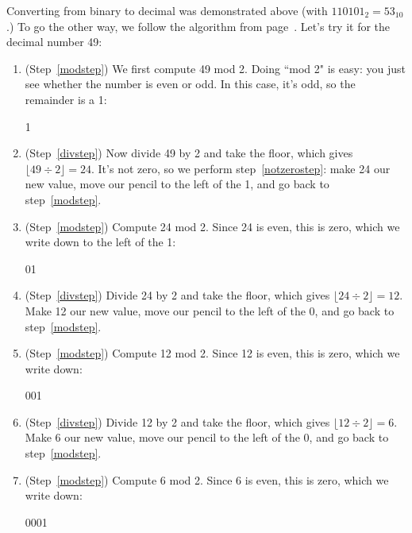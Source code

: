 Converting from binary to decimal was demonstrated above (with
$110101_2=53_{10}$.) To go the other way, we follow the algorithm from
page~\pageref{convertalgorithm}. Let's try it for the decimal number 49:

\begin{enumerate}
\item (Step~\ref{modstep}) We first compute 49 mod 2. Doing ``mod 2" is
easy: you just see whether the number is even or odd. In this case, it's
odd, so the remainder is a 1:

{\Large
\begin{center}
1
\end{center}
}

\item (Step~\ref{divstep}) Now divide 49 by 2 and take the floor, which
gives $\lfloor \text{49} \div 2 \rfloor = 24$. It's not zero, so
we perform step~\ref{notzerostep}: make 24 our new value, move
our pencil to the left of the 1, and go back to step~\ref{modstep}.

\item (Step~\ref{modstep}) Compute 24 mod 2. Since 24 is even, this is
zero, which we write down to the left of the 1:

{\Large
\begin{center}
01
\end{center}
}

\item (Step~\ref{divstep}) Divide 24 by 2 and take the floor, which gives
$\lfloor \text{24} \div 2 \rfloor = 12$.  Make 12 our new value, move our
pencil to the left of the 0, and go back to step~\ref{modstep}.

\item (Step~\ref{modstep}) Compute 12 mod 2. Since 12 is even, this is
zero, which we write down:

{\Large
\begin{center}
001
\end{center}
}

\item (Step~\ref{divstep}) Divide 12 by 2 and take the floor, which gives
$\lfloor \text{12} \div 2 \rfloor = 6$.  Make 6 our new value, move our
pencil to the left of the 0, and go back to step~\ref{modstep}.

\item (Step~\ref{modstep}) Compute 6 mod 2. Since 6 is even, this is
zero, which we write down:

{\Large
\begin{center}
0001
\end{center}
}


\end{enumerate}
